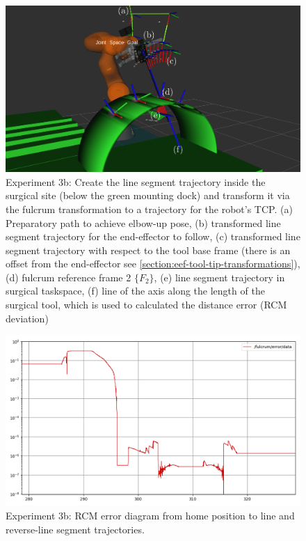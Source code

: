 \begin{center}
\begin{figure}[!htb]
\centering
\includegraphics[width=\textwidth]{images/robot_planner3/3b_line_seg.png}
\caption{Experiment 3b: Create the line segment trajectory inside the surgical site (below the green mounting dock) and transform it via the fulcrum transformation to a trajectory for the robot's TCP.
(a) Preparatory path to achieve elbow-up pose, (b) transformed line segment trajectory for the end-effector to follow, (c) transformed line segment trajectory with respect to the tool base frame (there is an offset from the 
end-effector see \ref{section:eef-tool-tip-transformations}), (d) fulcrum reference frame 2 $\lbrace F_2 \rbrace$, (e) line segment trajectory in surgical taskspace, (f) line of the axis along the length of the surgical tool, 
which is used to calculated the distance error (RCM deviation)}
\label{robot-planner3b-line-seg}
\end{figure}
\end{center}

\begin{center}
\begin{figure}[!htb]
\centering
\includegraphics[width=\textwidth]{images/robot_planner3/robot_planner3b_error.png}
\caption{Experiment 3b: RCM error diagram from home position to line and reverse-line segment trajectories.}
\label{robot-planner3b-line-seg-rcm-errors}
\end{figure}
\end{center}

